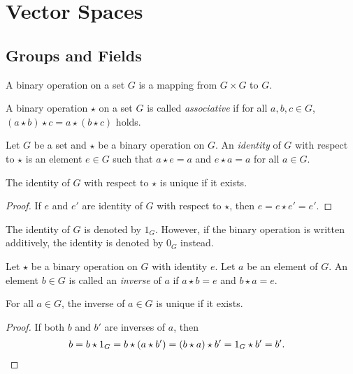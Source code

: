 \chapter{Vector Spaces}
\section{Groups and Fields}
\begin{definition}\label{def:binary-operation}
  A binary operation on a set $G$ is a mapping from $G \times G$ to $G$.
\end{definition}

\begin{definition}\label{def:associativity}
  A binary operation $\star$ on a set $G$ is called \emph{associative} if
  for all $a, b, c \in G$, $(a \star b) \star c = a \star (b \star c)$ holds.
\end{definition}

\begin{definition}\label{def:identity}
  Let $G$ be a set and $\star$ be a binary operation on $G$. An
  \emph{identity} of $G$ with respect to $\star$ is an element $e \in G$ such
  that $a \star e = a$ and $e \star a = a$ for all $a \in G$.
\end{definition}

\begin{theorem}\label{thm:identity-uniqueness}
  The identity of $G$ with respect to $\star$ is unique if it exists.
\end{theorem}
\begin{proof}
  If $e$ and $e'$ are identity of $G$ with respect to $\star$, then
  $e = e \star e' = e'$.
\end{proof}

\begin{notation}
  The identity of $G$ is denoted by $1_G$.
  However, if the binary operation is written additively, the identity is
  denoted by $0_G$ instead.
\end{notation}

\begin{definition}\label{def:inverse}
  Let $\star$ be a binary operation on $G$ with identity $e$. Let $a$ be an
  element of $G$. An element $b \in G$ is called an \emph{inverse} of $a$ if
  $a \star b = e$ and $b \star a = e$.
\end{definition}

\begin{theorem}\label{thm:inverse-uniqueness}
  For all $a \in G$, the inverse of $a \in G$ is unique if it exists.
\end{theorem}
\begin{proof}
  If both $b$ and $b'$ are inverses of $a$, then
  \begin{align*}
  b
  = b \star 1_G
  = b \star (a \star b')
  = (b \star a) \star b'
  = 1_G \star b'
  = b'. &\qedhere
  \end{align*}
\end{proof}

